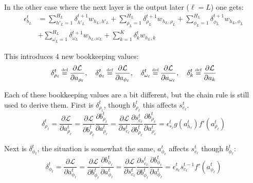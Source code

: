 In the other case where the next layer is the output later ($\ell = L$) one gets:
\begin{equation}
\begin{aligned}
\epsilon_{b_L}^t &=
	\sum_{h'_L=1}^{H_L} \delta_{h'_L}^{t+1} w_{h_L, h'_L}
	+ \sum_{\rho_L=1}^{H_L} \delta_{\rho_L}^{t+1} w_{h_L, \rho_L}
	+ \sum_{\phi_L=1}^{H_L} \delta_{\phi_L}^{t+1} w_{h_L, \phi_L} \\
&+
	\sum_{\omega_L=1}^{H_L} \delta_{\omega_L}^{t+1} w_{h_L, \omega_L}
	+ \sum_{k=1}^{K} \delta_{k}^t w_{h_L, k}
\end{aligned}
\end{equation}

This introduces 4 new bookkeeping values:
\begin{equation}
\delta_{\rho_\ell}^t \defeq \frac{\partial \mathcal{L}}{\partial a_{\rho_\ell}}
,\quad \delta_{\phi_\ell}^t \defeq \frac{\partial \mathcal{L}}{\partial a_{\phi_\ell}}
,\quad \delta_{\omega_\ell}^t \defeq \frac{\partial \mathcal{L}}{\partial a_{\omega_\ell}}
,\quad \delta_k^t \defeq \frac{\partial \mathcal{L}}{\partial a_k} 
\end{equation}

Each of these bookkeeping values are a bit different, but the chain rule is still used to derive them. First is $\delta_{\rho_\ell}^t$, though $b_{\rho_\ell}^t$ this affects $s_{c_\ell}^t$.
\begin{equation}
\delta_{\rho_\ell}^t
= \frac{\partial \mathcal{L}}{\partial a_{\rho_\ell}^t}
= \frac{\partial \mathcal{L}}{\partial b_{\rho_\ell}^t} \frac{\partial b_{\rho_\ell}^t}{\partial a_{\rho_\ell}^t}
= \frac{\partial \mathcal{L}}{\partial s_{c_\ell}^t} \frac{\partial s_{c_\ell}^t}{\partial b_{\rho_\ell}^t} \frac{\partial b_{\rho_\ell}^t}{\partial a_{\rho_\ell}^t}
= \epsilon_{s_\ell}^t g(a_{h_\ell}^t) f'(a_{\rho_\ell}^t)
\end{equation}

Next is $\delta_{\phi_\ell}^t$, the situation is somewhat the same, $a_{\phi_\ell}^t$ affects $s_{c_\ell}^t$ though $b_{\phi_\ell}^t$:
\begin{equation}
\delta_{\phi_\ell}^t
= \frac{\partial \mathcal{L}}{\partial a_{\phi_\ell}^t}
= \frac{\partial \mathcal{L}}{\partial b_{\phi_\ell}^t} \frac{\partial b_{\phi_\ell}^t}{\partial a_{\phi_\ell}^t}
= \frac{\partial \mathcal{L}}{\partial s_{c_\ell}^t} \frac{\partial s_{c_\ell}^t}{\partial b_{\phi_\ell}^t} \frac{\partial b_{\phi_\ell}^t}{\partial a_{\phi_\ell}^t}
= \epsilon_{s_\ell}^t s_{c_\ell}^{t-1} f'(a_{\phi_\ell}^t)
\end{equation}

